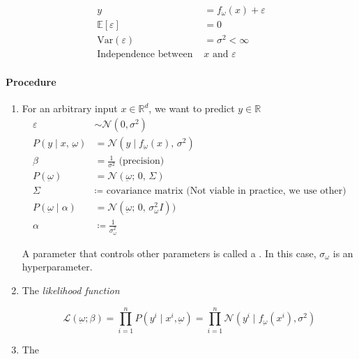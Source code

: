 \begin{align*}
  y &= f_\omega(x) + \varepsilon \\
  \mathds{E}[\varepsilon] &= 0 \\
  \text{Var}(\varepsilon) &= \sigma^2 < \infty \\
  \text{Independence between }& x \text{ and }\varepsilon
\end{align*}

\paragraph{Procedure}

\begin{enumerate}
	\item For an arbitrary input \(x \in \mathds{R}^d\), we want to predict
	      \(y \in \mathds{R}\)
	      \begin{align*}
		      \varepsilon                      & \sim \mathcal{N}(0, \sigma^2)                                       \\
		      P(y \mid x,\, \underbar{\omega})   & = \mathcal{N}(y \mid f_{\underbar{\omega}}(x),\, \sigma^2)               \\
		      \beta                         & = \frac{1}{\sigma^2} \text{ (precision)}                            \\
		      P(\underbar{\omega})          & = \mathcal{N}(\underbar{\omega} ;\, 0 ,\, \Sigma)                       \\
		      \Sigma                        & \coloneqq \text{ covariance matrix (Not viable in practice, we use other)} \\
		      P(\underbar{\omega} \mid \alpha) & = \mathcal{N}(\underbar{\omega} ;\, 0 ,\,\sigma_{\omega}^2 I))         \\
		      \alpha                        & \coloneqq \frac{1}{\sigma_{\omega}^2}
	      \end{align*}

	      A parameter that controls other parameters is called a
	      . In this case, \(\sigma_\omega\) is an
	      hyperparameter.

	\item The \emph{likelihood function}

	      \[
		      \mathcal{L}(\underbar{\omega} ; \beta) = \prod_{i=1}^n P(y^i \mid x^i, \underbar{\omega}) =
		      \prod_{i=1}^n \mathcal{N}(y^i \mid f_{\underbar{\omega}}(x^i), \sigma^2)
	      \]

	\item The 
\end{enumerate}

